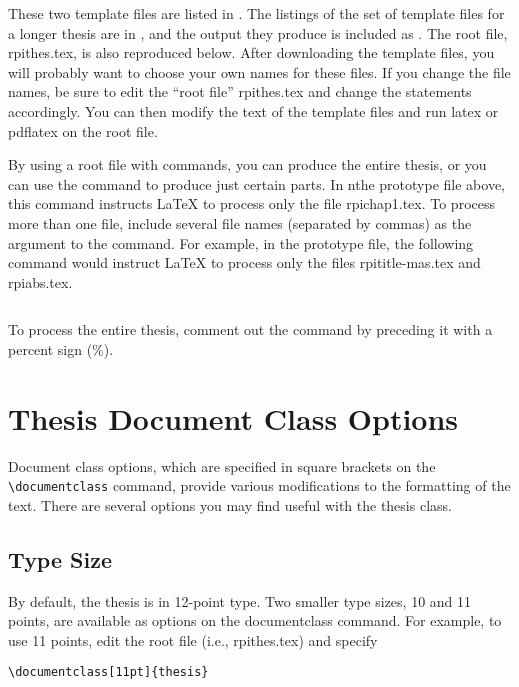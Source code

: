 \documentclass[letterpaper,11pt]{article}
\begin{document}
These two template files are listed in . The listings of the set of template files for
a longer thesis are in , and the output they produce is included as .
The root file, rpithes.tex, is also reproduced below.
After downloading the template files, you will probably want to choose your own names for
these files. If you change the file names, be sure to edit the ``root file'' rpithes.tex and change
the \verb|| statements accordingly. You can then modify the text of the template files and
run latex or pdflatex on the root file.




By using a root file with \verb|| commands, you can produce the entire thesis, or you can
use the \verb|| command to produce just certain parts. In nthe prototype file above,
this command instructs {\LaTeX} to process only the file rpichap1.tex. To process more than one
file, include several file names (separated by commas) as the argument to the \verb||
command. For example, in the prototype file, the following command would instruct {\LaTeX} to
process only the files rpititle-mas.tex and rpiabs.tex.
\begin{verbatim}

\end{verbatim}
To process the entire thesis, comment out the \verb|| command by preceding it with a
percent sign (\%).


\section{Thesis Document Class Options}

Document class options, which are specified in square brackets on the
\verb|\documentclass| command, provide various modifications to the
formatting of the text. There are several options you may find useful
with the thesis class.

\subsection{Type Size}

By default, the thesis is in 12-point type. Two smaller type sizes, 10 and 11 points, are available
as options on the documentclass command. For example, to use 11 points, edit the root file
(i.e., rpithes.tex) and specify
\begin{verbatim}
\documentclass[11pt]{thesis}
\end{verbatim}
\end{document}
